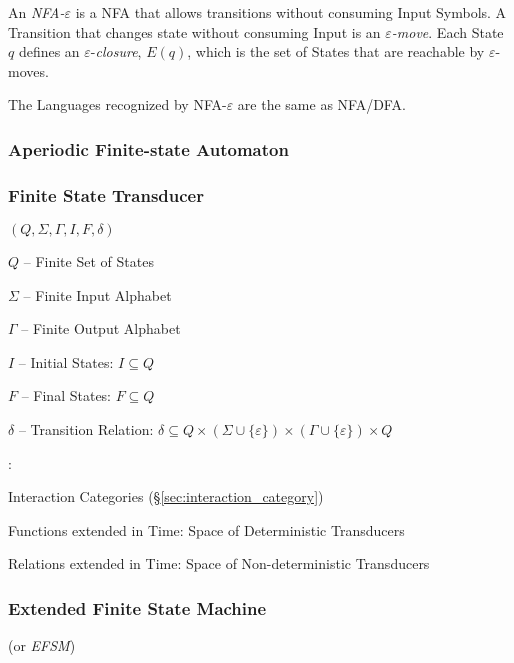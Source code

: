 An \emph{NFA-$\varepsilon$} is a NFA that allows transitions without
consuming Input Symbols. A Transition that changes state without
consuming Input is an \emph{$\varepsilon$-move}. Each State $q$
defines an $\varepsilon$-\emph{closure}, $E(q)$, which is the set of
States that are reachable by $\varepsilon$-moves.

The Languages recognized by NFA-$\varepsilon$ are the same as NFA/DFA.



\subsubsection{Aperiodic Finite-state Automaton}
\label{sec:aperiodic_automaton}

\subsubsection{Finite State Transducer}\label{sec:fst}

$(Q,\Sigma,\Gamma,I,F,\delta)$

$Q$ -- Finite Set of States

$\Sigma$ -- Finite Input Alphabet

$\Gamma$ -- Finite Output Alphabet

$I$ -- Initial States: $I \subseteq Q$

$F$ -- Final States: $F \subseteq Q$

$\delta$ -- Transition Relation: $\delta \subseteq Q \times (\Sigma
\cup \{\varepsilon\}) \times (\Gamma \cup \{\varepsilon\}) \times Q$


\asterism


\cite{abramsky-gay-nagarajan96}:

Interaction Categories (\S\ref{sec:interaction_category})

Functions extended in Time: Space of Deterministic Transducers

Relations extended in Time: Space of Non-deterministic Transducers



\subsubsection{Extended Finite State Machine}\label{sec:extended_state}

(or \emph{EFSM})

